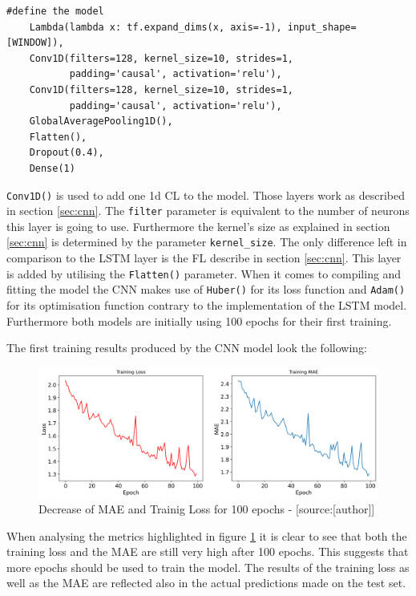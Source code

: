  \begin{lstlisting}
#define the model 
    Lambda(lambda x: tf.expand_dims(x, axis=-1), input_shape=[WINDOW]),
    Conv1D(filters=128, kernel_size=10, strides=1,
           padding='causal', activation='relu'),
    Conv1D(filters=128, kernel_size=10, strides=1,
           padding='causal', activation='relu'),
    GlobalAveragePooling1D(),
    Flatten(),
    Dropout(0.4),
    Dense(1)
\end{lstlisting}
\verb|Conv1D()| is used to add one 1d CL to the model. Those layers work as described in section \ref{sec:cnn}.  The \verb|filter| parameter is equivalent to the number of neurons this layer is going to use. Furthermore the kernel's size as explained in section \ref{sec:cnn} is determined by the parameter \verb|kernel_size|.
The only difference left in comparison to the LSTM layer is the FL describe in section \ref{sec:cnn}. This layer is added by utilising the \verb|Flatten()| parameter. When it comes to compiling and fitting the model the CNN makes use of  \verb|Huber()| for its loss function and \verb|Adam()| for its optimisation function contrary to the implementation of the LSTM model. Furthermore both models are initially using 100 epochs for their first training. \newline

The first training results produced by the CNN model look the following: 

\begin{figure}[H]
	\centering
		\includegraphics[width=14cm]{images/cnn_model_1_loss}
	\caption{Decrease of MAE and Trainig Loss for 100 epochs - [source:[author]]}
	\label{fig:training_test_cnn}
\end{figure}
When analysing the metrics highlighted in figure \ref{fig:training_test_cnn} it is clear to see that both the training loss and the MAE are still very high after 100 epochs. This suggests that more epochs should be used to train the model. The results of the training loss as well as the MAE are reflected also in the actual predictions made on the test set.

